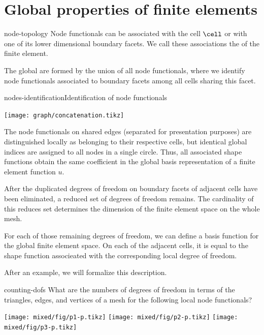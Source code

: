 \section{Global properties of finite elements}

\begin{Definition}{node-topology}
  Node functionals can be associated with the cell $\cell$ or with one
  of its lower dimensional boundary facets. We call these associations
  the  of the finite element.

  The global  are formed by the union of all
  node functionals, where we identify node functionals associated to
  boundary facets among all cells sharing this facet.  
\end{Definition}

\begin{Example*}{nodes-identification}{Identification of node functionals}
  \begin{center}
    \texttt{[image: graph/concatenation.tikz]}    
  \end{center}
  The node functionals on
    shared edges (separated for presentation purposes) are
    distinguished locally as belonging to their respective cells, but
    identical global indices are assigned to all nodes in a single
    circle. Thus, all associated shape functions obtain the same
    coefficient in the global basis representation of a finite element
    function $u$.
\end{Example*}

\begin{intro}
  After the duplicated degrees of freedom on boundary facets of
  adjacent cells have been eliminated, a reduced set of degrees of
  freedom remains. The cardinality of this reduces set determines the
  dimension of the finite element space on the whole mesh.

  For each of those remaining degrees of freedom, we can define a
  basis function for the global finite element space. On each of the
  adjacent cells, it is equal to the shape function associeated with
  the corresponding local degree of freedom.

  After an example, we will formalize this description.
\end{intro}

\begin{Problem}{counting-dofs}
  What are the numbers of degrees of freedom in terms of the
  triangles, edges, and vertices of a mesh for the following local
  node functionals?
  \begin{center}
    \texttt{[image: mixed/fig/p1-p.tikz]}
    \hspace{10mm}
    \texttt{[image: mixed/fig/p2-p.tikz]}
    \hspace{10mm}
    \texttt{[image: mixed/fig/p3-p.tikz]}
  \end{center}
\end{Problem}


